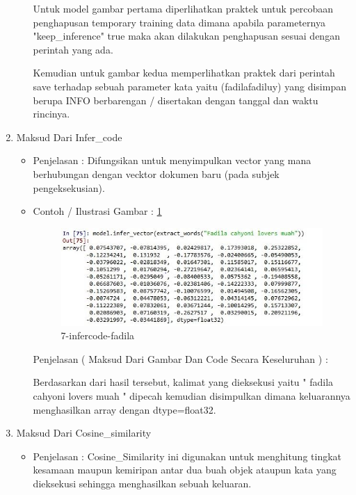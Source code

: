 \begin{enumerate}
\begin{itemize}
\par Untuk model gambar pertama diperlihatkan praktek untuk percobaan penghapusan temporary training data dimana apabila parameternya "keep\_inference" true maka akan dilakukan penghapusan sesuai dengan perintah yang ada.
\par Kemudian untuk gambar kedua memperlihatkan praktek dari perintah save terhadap sebuah parameter kata yaitu (fadilafadiluy) yang disimpan berupa INFO berbarengan / disertakan dengan tanggal dan waktu rincinya.
\end{itemize}
\item Maksud Dari Infer\_code
\begin{itemize}
\item Penjelasan : Difungsikan untuk menyimpulkan vector yang mana berhubungan dengan vecktor dokumen baru (pada subjek pengeksekusian).
\item Contoh / Ilustrasi Gambar : \ref{7-infercode-fadila}
\par
\begin{figure}[!hbtp]
\centering
\includegraphics[scale=0.3]{figures/7-infercode-fadila.jpg}
\caption{7-infercode-fadila}
\label{7-infercode-fadila}
\end{figure}
\par
\par Penjelasan ( Maksud Dari Gambar Dan Code Secara Keseluruhan ) : 
\par Berdasarkan dari hasil tersebut, kalimat yang dieksekusi yaitu " fadila cahyoni lovers muah " dipecah kemudian disimpulkan dimana keluarannya menghasilkan array dengan dtype=float32.
\par
\end{itemize}
\item Maksud Dari Cosine\_similarity
\begin{itemize}
\item Penjelasan : Cosine\_Similarity ini digunakan untuk menghitung tingkat kesamaan maupun kemiripan antar dua buah objek ataupun kata yang dieksekusi sehingga menghasilkan sebuah keluaran.

\end{itemize}
\end{enumerate}
